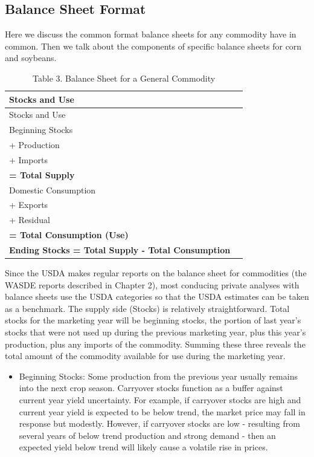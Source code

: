 \documentclass[
]{book}
\providecommand{\tightlist}{%
  \setlength{\itemsep}{0pt}\setlength{\parskip}{0pt}}
\begin{document}
\hypertarget{balance-sheet-format}{%
\subsection{Balance Sheet Format}\label{balance-sheet-format}}

Here we discuss the common format balance sheets for any commodity have in common. Then we talk about the components of specific balance sheets for corn and soybeans.

\begin{longtable}[]{@{}ll@{}}
\caption{Table 3. Balance Sheet for a General Commodity}\tabularnewline
\toprule
Stocks and Use &\tabularnewline
\midrule
\endfirsthead
\toprule
Stocks and Use &\tabularnewline
\midrule
\endhead
Beginning Stocks &\tabularnewline
+ Production &\tabularnewline
+ Imports &\tabularnewline
\textbf{= Total Supply} &\tabularnewline
Domestic Consumption &\tabularnewline
+ Exports &\tabularnewline
+ Residual &\tabularnewline
\textbf{= Total Consumption (Use)} &\tabularnewline
\textbf{Ending Stocks = Total Supply - Total Consumption} &\tabularnewline
\bottomrule
\end{longtable}

Since the USDA makes regular reports on the balance sheet for commodities (the WASDE reports described in Chapter 2), most conducing private analyses with balance sheets use the USDA categories so that the USDA estimates can be taken as a benchmark. The supply side (Stocks) is relatively straightforward. Total stocks for the marketing year will be beginning stocks, the portion of last year's stocks that were not used up during the previous marketing year, plus this year's production, plus any imports of the commodity. Summing these three reveals the total amount of the commodity available for use during the marketing year.

\begin{itemize}
\tightlist
\item
  Beginning Stocks: Some production from the previous year usually remains into the next crop season. Carryover stocks function as a buffer against current year yield uncertainty. For example, if carryover stocks are high and current year yield is expected to be below trend, the market price may fall in response but modestly. However, if carryover stocks are low - resulting from several years of below trend production and strong demand - then an expected yield below trend will likely cause a volatile rise in prices.
\end{itemize}
\end{document}
